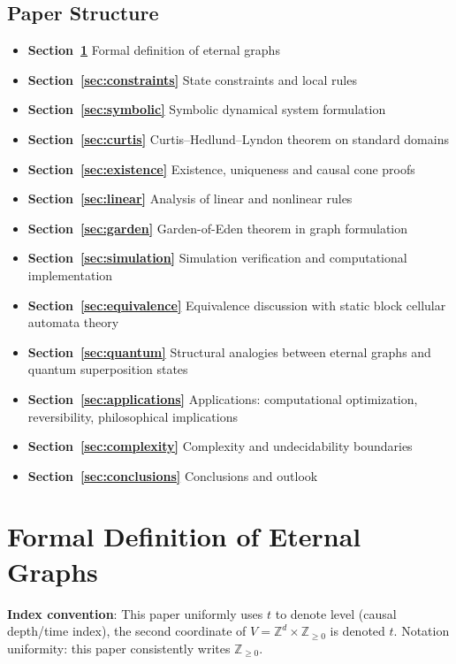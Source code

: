 \documentclass[11pt]{article}
\theoremstyle{definition}
\theoremstyle{remark}
\begin{document}
\subsection{Paper Structure}

\begin{itemize}
\item \textbf{Section~\ref{sec:formal}} Formal definition of eternal graphs
\item \textbf{Section~\ref{sec:constraints}} State constraints and local rules
\item \textbf{Section~\ref{sec:symbolic}} Symbolic dynamical system formulation
\item \textbf{Section~\ref{sec:curtis}} Curtis--Hedlund--Lyndon theorem on standard domains
\item \textbf{Section~\ref{sec:existence}} Existence, uniqueness and causal cone proofs
\item \textbf{Section~\ref{sec:linear}} Analysis of linear and nonlinear rules
\item \textbf{Section~\ref{sec:garden}} Garden-of-Eden theorem in graph formulation
\item \textbf{Section~\ref{sec:simulation}} Simulation verification and computational implementation
\item \textbf{Section~\ref{sec:equivalence}} Equivalence discussion with static block cellular automata theory
\item \textbf{Section~\ref{sec:quantum}} Structural analogies between eternal graphs and quantum superposition states
\item \textbf{Section~\ref{sec:applications}} Applications: computational optimization, reversibility, philosophical implications
\item \textbf{Section~\ref{sec:complexity}} Complexity and undecidability boundaries
\item \textbf{Section~\ref{sec:conclusions}} Conclusions and outlook
\end{itemize}

\section{Formal Definition of Eternal Graphs}\label{sec:formal}

\textbf{Index convention}: This paper uniformly uses \( t \) to denote level (causal depth/time index), the second coordinate of \( V = \mathbb{Z}^d \times \mathbb{Z}_{\ge0} \) is denoted \( t \). Notation uniformity: this paper consistently writes \( \mathbb{Z}_{\ge0} \).
\end{document}
